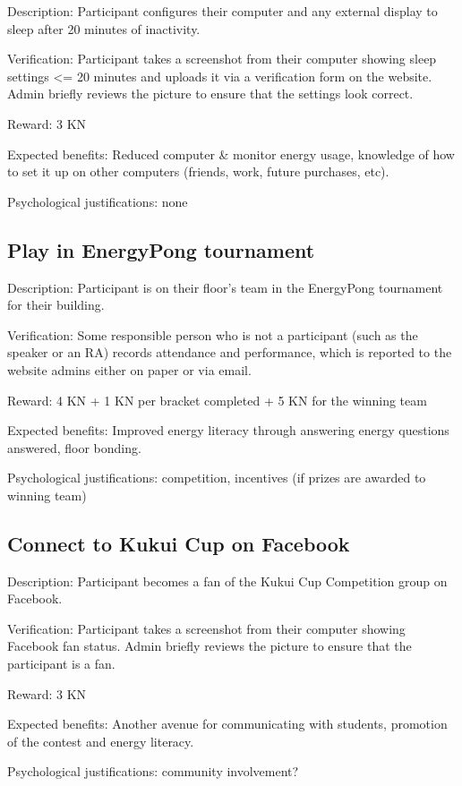 Description: Participant configures their computer and any external display to sleep after 20 minutes of inactivity.

Verification: Participant takes a screenshot from their computer showing sleep settings <= 20 minutes and uploads it via a verification form on the website. Admin briefly reviews the picture to ensure that the settings look correct.

Reward: 3 KN

Expected benefits: Reduced computer \& monitor energy usage, knowledge of how to set it up on other computers (friends, work, future purchases, etc).

Psychological justifications: none

\subsection{Play in EnergyPong tournament}

Description: Participant is on their floor's team in the EnergyPong tournament for their building.

Verification: Some responsible person who is not a participant (such as the speaker or an RA) records attendance and performance, which is reported to the website admins either on paper or via email.

Reward: 4 KN + 1 KN per bracket completed + 5 KN for the winning team

Expected benefits: Improved energy literacy through answering energy questions answered, floor bonding.

Psychological justifications: competition, incentives (if prizes are awarded to winning team)

\subsection{Connect to Kukui Cup on Facebook}

Description: Participant becomes a fan of the Kukui Cup Competition group on Facebook.

Verification: Participant takes a screenshot from their computer showing Facebook fan status. Admin briefly reviews the picture to ensure that the participant is a fan.

Reward: 3 KN

Expected benefits: Another avenue for communicating with students, promotion of the contest and energy literacy.

Psychological justifications: community involvement?

